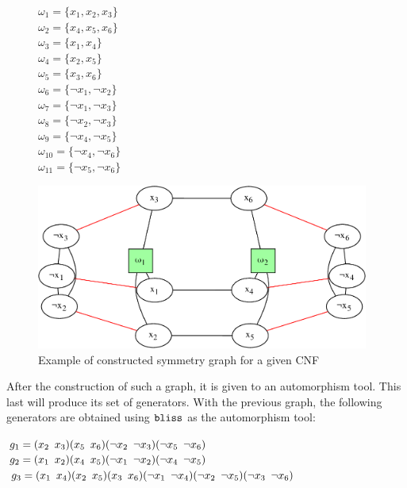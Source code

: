\begin{figure}[!htbp]
 \begin{minipage}[r]{.2\textwidth}
   $\omega_{1} = \{ x_{1}, x_{2}, x_{3} \}$ \\
 $\omega_{2} = \{ x_{4}, x_{5}, x_{6} \}$ \\
 $\omega_{3} = \{ x_{1}, x_{4} \}$ \\
 $\omega_{4} = \{ x_{2}, x_{5} \}$ \\
 $\omega_{5} = \{ x_{3}, x_{6} \}$ \\
 $\omega_{6} = \{ \neg x_{1}, \neg x_{2} \}$ \\
 $\omega_{7} = \{ \neg x_{1}, \neg x_{3} \}$ \\
 $\omega_{8} = \{ \neg x_{2}, \neg x_{3} \}$ \\
 $\omega_{9} = \{ \neg x_{4}, \neg x_{5} \}$ \\
 $\omega_{10} = \{ \neg x_{4}, \neg x_{6} \}$ \\
 $\omega_{11} = \{ \neg x_{5}, \neg x_{6} \}$ \\
 \end{minipage}
 \begin{minipage}[r]{.75\textwidth}
  \includegraphics[width=4.3in]{cnfs/graph_cnf_opt-crop}
 \end{minipage}
 \caption{Example of constructed symmetry graph for a given CNF}
  \label{fig:graph_opt}
\end{figure}


After the construction of such a graph, it is given to an automorphism tool.
This last will produce its set of generators.
With the previous graph, the following generators are obtained using $\texttt{bliss}$ as the automorphism tool:

\begin{center}
 \begin{minipage}[c]{.635\textwidth}
  $g_1 = (x_2 \enskip x_3)(x_5 \enskip x_6)(\neg x_2 \enskip \neg x_3)(\neg x_5 \enskip \neg x_6)$\\
  $g_2 = (x_1 \enskip x_2)(x_4 \enskip x_5)(\neg x_1 \enskip \neg x_2)(\neg x_4 \enskip \neg x_5)$\\
  $g_3 = (x_1 \enskip x_4)(x_2 \enskip x_5)(x_3 \enskip x_6)(\neg x_1 \enskip \neg x_4)(\neg x_2 \enskip \neg x_5)(\neg x_3 \enskip \neg x_6)$
 \end{minipage}
\end{center}

